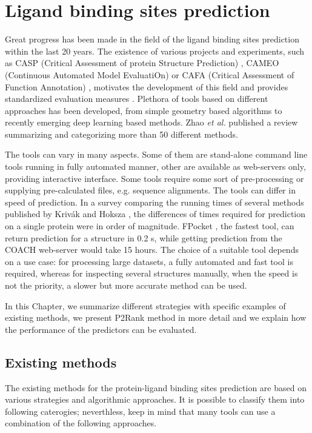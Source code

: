 \chapter{Ligand binding sites prediction} \label{ch:2}

Great progress has been made in the field of the ligand binding sites prediction within the last 20 years. The existence of various projects and experiments, such as CASP (Critical Assessment of protein Structure Prediction) \cite{casp_def}, CAMEO (Continuous Automated Model EvaluatiOn) \cite{cameo} or CAFA (Critical Assessment of Function Annotation) \cite{cafa}, motivates the development of this field and provides standardized evaluation measures \cite{methods}. Plethora of tools based on different approaches has been developed, from simple geometry based algorithms to recently emerging deep learning based methods. Zhao \textit{et al.} \cite{methods} published a review summarizing and categorizing more than 50 different methods.

The tools can vary in many aspects. Some of them are stand-alone command line tools running in fully automated manner, other are available as web-servers only, providing interactive interface. Some tools require some sort of pre-processing or supplying pre-calculated files, e.g. sequence alignments. The tools can differ in speed of prediction. In a survey comparing the running times of several methods published by Krivák and Hoksza \cite{p2rank1}, the differences of times required for prediction on a single protein were in order of magnitude. FPocket \cite{fpocket}, the fastest tool, can return prediction for a structure in 0.2 s, while getting prediction from the COACH web-server \cite{coachweb} would take 15 hours. The choice of a suitable tool depends on a use case: for processing large datasets, a fully automated and fast tool is required, whereas for inspecting several structures manually, when the speed is not the priority, a slower but more accurate method can be used.

In this Chapter, we summarize different strategies with specific examples of existing methods, we present P2Rank method in more detail and we explain how the performance of the predictors can be evaluated.

\section{Existing methods}

The existing methods for the protein-ligand binding sites prediction are based on various strategies and algorithmic approaches. It is possible to classify them into following caterogies; neverthless, keep in mind that many tools can use a combination of the following approaches.

